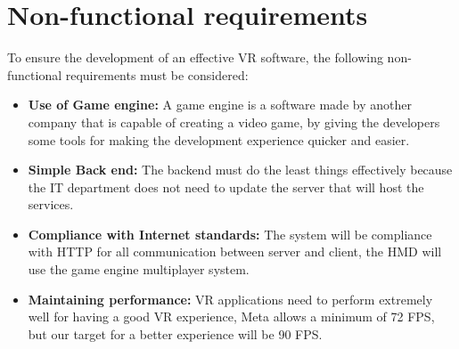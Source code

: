 \section{Non-functional requirements}
\noindent
To ensure the development of an effective \ac{VR} software, the following non-functional requirements must be considered:

\begin{itemize}
  \item \textbf{Use of Game engine:} A game engine is a software made by another company that is capable of creating a video game, by giving the developers some tools for making the development experience quicker and easier.
  \item \textbf{Simple Back end:} The backend must do the least things effectively because the IT department does not need to update the server that will host the services.
  \item \textbf{Compliance with Internet standards:} The system will be compliance with \ac{HTTP} for all communication between server and client, the \ac{HMD} will use the game engine multiplayer system.
  \item \textbf{Maintaining performance:} \ac{VR} applications need to perform extremely well for having a good \ac{VR} experience, Meta allows a minimum of 72 \ac{FPS}, but our target for a better experience will be 90 \ac{FPS}.
\end{itemize}

